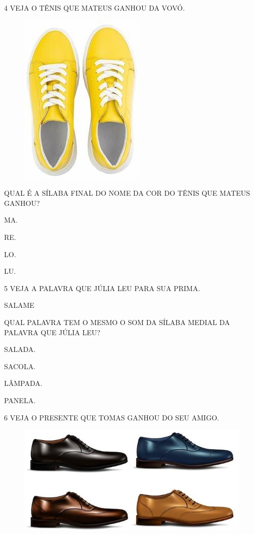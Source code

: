\pagebreak
\num{4} VEJA O TÊNIS QUE MATEUS GANHOU DA VOVÓ. 

\begin{figure}[htpb!]
\centering
\includegraphics[width=.2\textwidth]{media/image189.jpg}
\end{figure}

QUAL É A SÍLABA FINAL DO NOME DA COR DO TÊNIS QUE MATEUS GANHOU?

\begin{escolha}
\item MA.

\item RE.

\item LO.

\item LU.
\end{escolha}

\num{5} VEJA A PALAVRA QUE JÚLIA LEU PARA SUA PRIMA.

\begin{myquote}
SALAME
\end{myquote}

QUAL PALAVRA TEM O MESMO O SOM DA SÍLABA MEDIAL DA PALAVRA QUE JÚLIA LEU?

\begin{escolha}
\item SALADA.

\item SACOLA.

\item LÂMPADA.

\item PANELA.
\end{escolha}

\pagebreak
\num{6} VEJA O PRESENTE QUE TOMAS GANHOU DO SEU AMIGO.

\begin{figure}[htpb!]
\centering
\includegraphics[width=.5\textwidth]{media/image191.jpg}
\end{figure}

